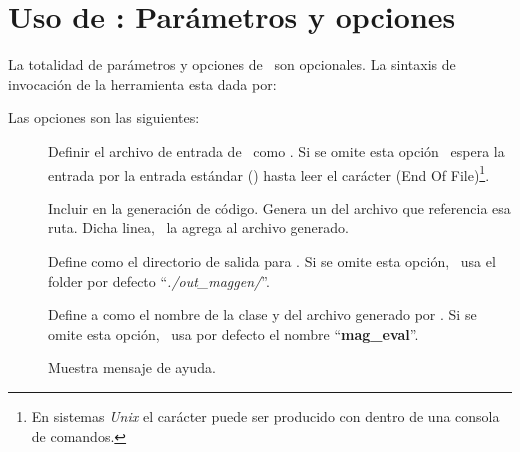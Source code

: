 \section{Uso de \maggen: Parámetros y opciones}
\label{sec:uso-maggen}
La totalidad de parámetros y opciones de \maggen\ son opcionales. La sintaxis de invocación de la herramienta esta dada por:\\
\begin{center}\end{center}

Las opciones son las siguientes:

\begin{description}
\item [] Definir el archivo de entrada de \maggen\ como . Si se omite esta opción \maggen\ espera la entrada por la entrada estándar () hasta leer el carácter  (End Of File)\footnote{En sistemas \textit{Unix} el carácter  puede ser producido con  dentro de una consola de comandos.}.

\item [] Incluir  en la generación de código. Genera un  del archivo que referencia esa ruta. Dicha linea, \maggen\ la agrega al archivo generado.

\item [] Define  como el directorio de salida para \maggen. Si se omite esta opción, \maggen\ usa el folder por defecto ``\textit{./out\_maggen/}''.

\item [] Define a  como el nombre de la clase y del archivo generado por \maggen. Si se omite esta opción, \maggen\ usa por defecto el nombre ``\textbf{mag\_eval}''.

\item [] Muestra mensaje de ayuda.
\end{description}

